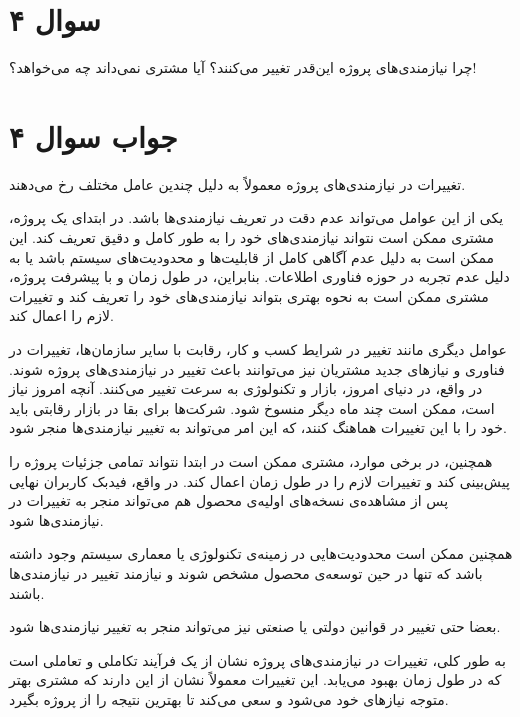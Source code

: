 \section*{سوال ۴}

چرا نیازمندی‌های پروژه این‌قدر تغییر می‌کنند؟ آیا مشتری نمی‌داند چه می‌خواهد؟!

\section*{جواب سوال ۴}

تغییرات در نیازمندی‌های پروژه معمولاً به دلیل چندین عامل مختلف رخ می‌دهند.


یکی از این عوامل می‌تواند عدم دقت در تعریف نیازمندی‌ها باشد. در ابتدای یک پروژه، مشتری ممکن است نتواند نیازمندی‌های خود را به طور کامل و دقیق تعریف کند. این ممکن است به دلیل عدم آگاهی کامل از قابلیت‌ها و محدودیت‌های سیستم باشد یا به دلیل عدم تجربه در حوزه فناوری اطلاعات. بنابراین، در طول زمان و با پیشرفت پروژه، مشتری ممکن است به نحوه بهتری بتواند نیازمندی‌های خود را تعریف کند و تغییرات لازم را اعمال کند.


عوامل دیگری مانند تغییر در شرایط کسب و کار، رقابت با سایر سازمان‌ها، تغییرات در فناوری و نیازهای جدید مشتریان نیز می‌توانند باعث تغییر در نیازمندی‌های پروژه شوند. در واقع، در دنیای امروز، بازار و تکنولوژی به سرعت تغییر می‌کنند. آنچه امروز نیاز است، ممکن است چند ماه دیگر منسوخ شود. شرکت‌ها برای بقا در بازار رقابتی باید خود را با این تغییرات هماهنگ کنند، که این امر می‌تواند به تغییر نیازمندی‌ها منجر شود.


همچنین، در برخی موارد، مشتری ممکن است در ابتدا نتواند تمامی جزئیات پروژه را پیش‌بینی کند و تغییرات لازم را در طول زمان اعمال کند. در واقع، فیدبک کاربران نهایی پس از مشاهده‌ی نسخه‌های اولیه‌ی محصول هم می‌تواند منجر به تغییرات در نیازمندی‌ها شود.


همچنین ممکن است محدودیت‌هایی در زمینه‌ی تکنولوژی یا معماری سیستم وجود داشته باشد که تنها در حین توسعه‌ی محصول مشخص شوند و نیازمند تغییر در نیازمندی‌ها باشند.


بعضا حتی تغییر در قوانین دولتی یا صنعتی نیز می‌تواند منجر به تغییر نیازمندی‌ها شود.


به طور کلی، تغییرات در نیازمندی‌های پروژه نشان از یک فرآیند تکاملی و تعاملی است که در طول زمان بهبود می‌یابد. این تغییرات معمولاً نشان از این دارند که مشتری بهتر متوجه نیازهای خود می‌شود و سعی می‌کند تا بهترین نتیجه را از پروژه بگیرد.
